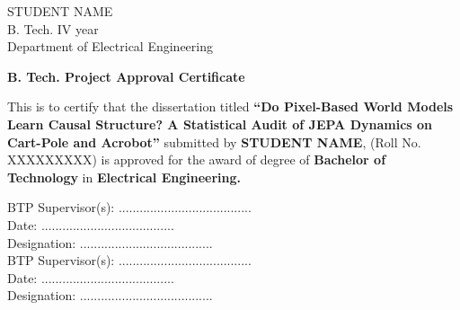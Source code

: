 \documentclass[11pt, a4paper, oneside,enumerate,textcomp]{report}
\newcommand{\BTPTitle}{Do Pixel-Based World Models Learn Causal Structure? A Statistical Audit of JEPA Dynamics on Cart-Pole and Acrobot}
\newcommand{\StudentName}{STUDENT NAME}
\newcommand{\RollNo}{XXXXXXXXX}
\newcommand{\Discipline}{Electrical Engineering}
\begin{document}
\vspace{1.5cm}
\begin{flushleft}
	\StudentName\\
	B. Tech. IV year\\
	Department of \Discipline
\end{flushleft}


\newpage
\begin{center}
	{\Large\bf {B. Tech. Project Approval Certificate}}
	\vspace{1.0cm}
\end{center}

	\par {This is to certify that the dissertation titled \textbf{``\BTPTitle''} submitted by \textbf{\StudentName}, (Roll No. \RollNo) is approved for the award of degree of \textbf{Bachelor of Technology} in \textbf{\Discipline.}}\\
	\vspace{1.0cm}

    \begin{flushright}
    	BTP Supervisor(s): \hspace{0.7cm} ......................................\\
		\vspace{0.6cm}
		             Date: \hspace{0.7cm} ......................................\\
		\vspace{0.6cm}
		     Designation: \hspace{0.7cm} ......................................\\
		\vspace{1.2cm}
		BTP Supervisor(s): \hspace{0.7cm} ......................................\\
		\vspace{0.6cm}
		             Date: \hspace{0.7cm} ......................................\\
		\vspace{0.6cm}
		     Designation: \hspace{0.7cm} ......................................\\
	 \end{flushright}

\end{document}
